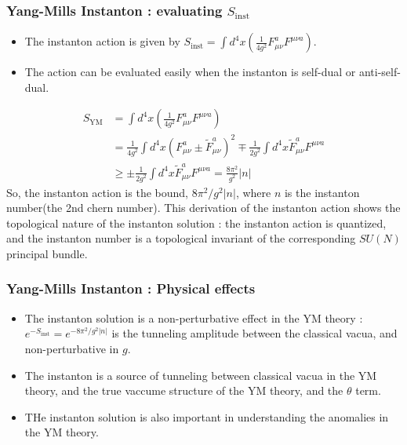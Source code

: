\documentclass[10pt]{beamer}
\begin{document}
\begin{frame}
        \frametitle{Yang-Mills Instanton : evaluating $S_{\text{inst}}$}
        \begin{itemize}
        \item The instanton action is given by $S_{\text{inst}} = \int d^4x \left(\frac{1}{4g^2}F_{\mu\nu}^a F^{\mu\nu a}\right)$.
        \item The action can be evaluated easily when the instanton is self-dual or anti-self-dual.
        \end{itemize}
        \begin{align*}
        S_{\text{YM}} &= \int d^4x \left(\frac{1}{4g^2}F_{\mu\nu}^a F^{\mu\nu a}\right) \\
        &=  \frac{1}{4g^2} \int d^4x \left(F_{\mu\nu}^a \pm \tilde{F}_{\mu\nu}^a\right)^2 \mp \frac{1}{2g^2} \int d^4x \tilde{F}_{\mu\nu}^a F^{\mu\nu a} \\ 
        &\geq \pm \frac{1}{2g^2} \int d^4x \tilde{F}_{\mu\nu}^a F^{\mu\nu a} = \frac{8\pi^2}{g^2}|n|
        \end{align*}
        So, the instanton action is the bound, $8\pi^2/g^2|n|$, where $n$ is the instanton number(the 2nd chern number).
        This derivation of the instanton action shows the topological nature of the instanton solution : the instanton action is quantized, and the instanton number is a topological invariant of the corresponding $SU(N)$ principal bundle.
        \end{frame}

\begin{frame}
\frametitle{Yang-Mills Instanton : Physical effects}
\begin{itemize}
\item The instanton solution is a non-perturbative effect in the YM theory : $e^{-S_{\text{inst}}}=e^{-8\pi^2/g^2|n|}$ is the tunneling amplitude between the classical vacua, and non-perturbative in $g$.
\item The instanton is a source of tunneling between classical vacua in the YM theory, and the true vaccume structure of the YM theory, and the $\theta$ term.
\item THe instanton solution is also important in understanding the anomalies in the YM theory.
\end{itemize}
\end{frame}
\end{document}
